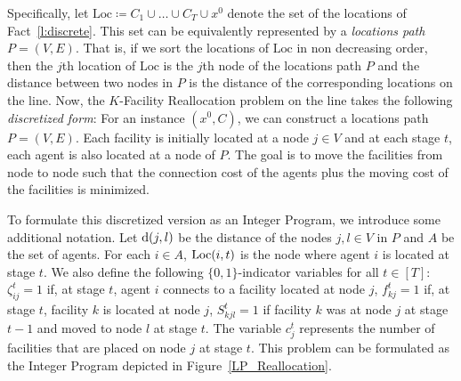Specifically, let $\mathrm{Loc} \coloneqq C_1 \cup \ldots \cup C_T \cup x^0$ denote the set of the  locations of Fact~\ref{l:discrete}. This set can be equivalently represented by a \emph{locations path} $P = (V,E)$. That is, if we sort the locations of $\mathrm{Loc}$ in non decreasing order, then the $j$th location of $\mathrm{Loc}$ is the $j$th node of the locations path $P$ and the distance between two nodes in $P$ is the distance of the corresponding locations on the line.
Now, the $K$-Facility Reallocation problem on the line takes the following 
\emph{discretized form}:
For an instance $(x^0,C)$, we can construct a locations path $P = (V,E)$.
Each facility is initially located at a node $j \in V$ and at each stage $t$, 
each agent is also located at a node of $P$.
The goal is to move the facilities from node to node such that the connection 
cost of the agents plus the moving cost
of the facilities is minimized.

To formulate this discretized version as an Integer Program,
we introduce some additional notation. Let $\mathrm{d}(j,l)$ be the distance of the nodes 
$j,l \in V$ in $P$ and $A$ be the set of agents. For each $i \in A$, $\mathrm{Loc}(i,t)$ is the node 
where agent $i$ is located at stage $t$.
We also define the following $\{0,1\}$-indicator variables for all $t\in [T] $:
$\zeta_{ij}^t =1$ if, at stage $t$, agent $i$ connects to a facility located at node $j$,
$f_{kj}^t =1$ if, at stage $t$, facility $k$ is located at node $j$,
$S_{kjl}^t =1$ if facility $k$ was at node $j$ at stage $t-1$ and moved to node 
$l$ at stage $t$. The variable $c_j^t$ represents the number of facilities that are placed on node $j$ at stage $t$. 
This problem can be formulated as the Integer Program depicted in 
Figure~\ref{LP_Reallocation}.

